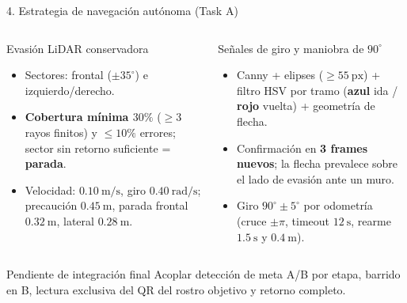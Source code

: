 \documentclass[aspectratio=169,10pt]{beamer}
\begin{document}
\begin{frame}{4. Estrategia de navegación autónoma (Task A)}
  \small
  \begin{columns}[T,onlytextwidth]
    \begin{block}{Evasión LiDAR conservadora}
      \begin{itemize}
        \item Sectores: frontal ($\pm 35^\circ$) e izquierdo/derecho.
        \item \textbf{Cobertura mínima $30\%$} ($\ge 3$ rayos finitos) y $\le 10\%$ errores; sector sin retorno suficiente = \textbf{parada}.
        \item Velocidad: $0.10\ \mathrm{m/s}$, giro $0.40\ \mathrm{rad/s}$; precaución $0.45\ \mathrm{m}$, parada frontal $0.32\ \mathrm{m}$, lateral $0.28\ \mathrm{m}$.
      \end{itemize}
    \end{block}

    \begin{block}{Señales de giro y maniobra de $90^\circ$}
      \begin{itemize}
        \item Canny + elipses ($\ge 55\ \mathrm{px}$) + filtro HSV por tramo (\textbf{azul} ida / \textbf{rojo} vuelta) + geometría de flecha.
        \item Confirmación en \textbf{3 frames nuevos}; la flecha prevalece sobre el lado de evasión ante un muro.
        \item Giro $90^\circ \pm 5^\circ$ por odometría (cruce $\pm\pi$, timeout $12\ \mathrm{s}$, rearme $1.5\ \mathrm{s}$ y $0.4\ \mathrm{m}$).
      \end{itemize}
    \end{block}
  \end{columns}
  \vspace{0.35em}
  \begin{alertblock}{Pendiente de integración final}
    \footnotesize Acoplar detección de meta A/B por etapa, barrido en B, lectura exclusiva del QR del rostro objetivo y retorno completo.
  \end{alertblock}
\end{frame}
\end{document}
